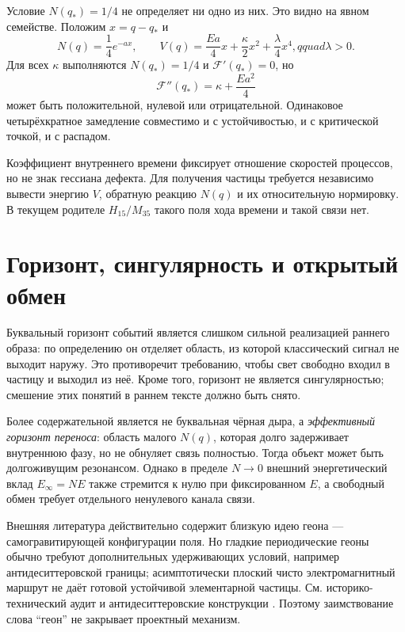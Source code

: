 Условие $N(q_*)=1/4$ не определяет ни одно из них. Это видно на явном
семействе. Положим $x=q-q_*$ и
\begin{equation}
 N(q)=\frac14 e^{-a x},\qquad
 V(q)=\frac{Ea}{4}x+\frac{\kappa}{2}x^2+
       \frac{\lambda}{4}x^4,qquad \lambda>0.
 \label{eq:v5-same-lapse-family}
\end{equation}
Для всех $\kappa$ выполняются $N(q_*)=1/4$ и $\mathcal F'(q_*)=0$, но
\begin{equation}
 \mathcal F''(q_*)=\kappa+\frac{Ea^2}{4}
 \label{eq:v5-same-lapse-hessian}
\end{equation}
может быть положительной, нулевой или отрицательной. Одинаковое
четырёхкратное замедление совместимо и с устойчивостью, и с критической
точкой, и с распадом.

\begin{theorem}
Коэффициент внутреннего времени фиксирует отношение скоростей процессов,
но не знак гессиана дефекта. Для получения частицы требуется независимо
вывести энергию $V$, обратную реакцию $N(q)$ и их относительную
нормировку. В текущем родителе $H_{15}/M_{35}$ такого поля хода времени и
такой связи нет.
\end{theorem}

\section{Горизонт, сингулярность и открытый обмен}

Буквальный горизонт событий является слишком сильной реализацией раннего
образа: по определению он отделяет область, из которой классический сигнал
не выходит наружу. Это противоречит требованию, чтобы свет свободно входил
в частицу и выходил из неё. Кроме того, горизонт не является
сингулярностью; смешение этих понятий в раннем тексте должно быть снято.

Более содержательной является не буквальная чёрная дыра, а
\emph{эффективный горизонт переноса}: область малого $N(q)$, которая долго
задерживает внутреннюю фазу, но не обнуляет связь полностью. Тогда объект
может быть долгоживущим резонансом. Однако в пределе $N\to0$ внешний
энергетический вклад $E_\infty=N E$ также стремится к нулю при фиксированном
$E$, а свободный обмен требует отдельного ненулевого канала связи.

Внешняя литература действительно содержит близкую идею геона ---
самогравитирующей конфигурации поля. Но гладкие периодические геоны обычно
требуют дополнительных удерживающих условий, например
антидеситтеровской границы; асимптотически плоский чисто
электромагнитный маршрут не даёт готовой устойчивой элементарной частицы.
См. историко-технический аудит  и
антидеситтеровские конструкции . Поэтому
заимствование слова ``геон'' не закрывает проектный механизм.

